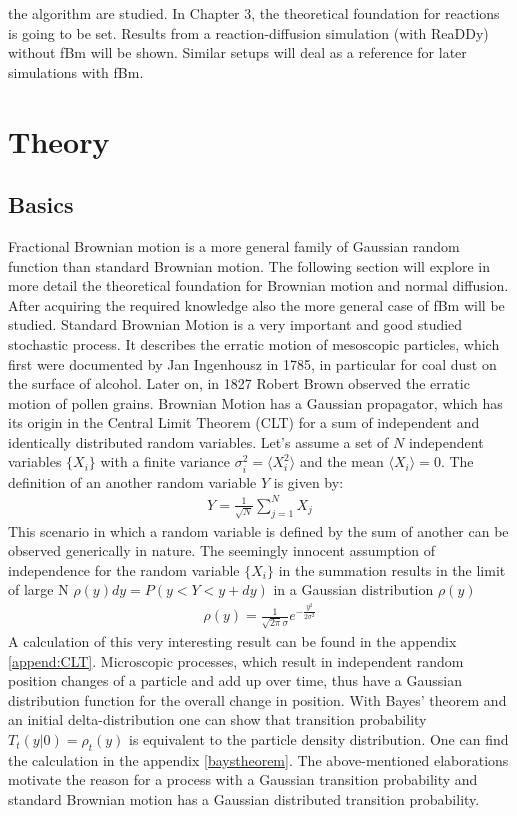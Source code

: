 \documentclass[
  a4paper,BCOR10mm,oneside,
  bibtotoc,idxtotoc,
  headsepline,footsepline,%
  fleqn,openbib
]{scrbook}
\begin{document}
the algorithm are studied. In Chapter 3, the theoretical foundation for reactions is going to be set. Results from a reaction-diffusion simulation (with ReaDDy) without fBm will be shown. Similar setups will deal as a reference for later simulations with fBm.

\chapter{Theory}
\section{Basics}
Fractional Brownian motion is a more general family of Gaussian random function than standard Brownian motion. The following section will explore in more detail the theoretical foundation for Brownian motion and normal diffusion. After acquiring the required knowledge also the more general case of fBm will be studied. \newline
Standard Brownian Motion is a very important and good studied stochastic process. It describes the erratic motion of mesoscopic particles, which first were documented by Jan Ingenhousz in 1785, in particular for coal dust on the surface of alcohol\cite{Hofling2013}. Later on, in 1827 Robert Brown observed the erratic motion of pollen grains. Brownian Motion has a Gaussian propagator, which has its origin in the Central Limit Theorem (CLT) for a sum of independent and identically distributed random variables. Let's assume a set of $N$ independent variables $\{X_i\}$ with a finite variance $ \sigma_i^2=\langle X_{i}^2\rangle $ and the mean $\langle X_{i}\rangle = 0$. The definition of an another random variable $Y$ is given by:
 \begin{align}
  Y = \frac{1}{\sqrt{N}} \sum_{j=1}^N X_j \label{eq:CLT}
 \end{align}
This scenario in which a random variable is defined by the sum of another can be observed generically in nature. The seemingly innocent assumption of independence for the random variable $\{X_i\}$ in the summation results in the limit of large N $\rho(y)dy=P(y<Y<y+dy)$ in a Gaussian distribution $\rho(y)$  
\begin{align}
 \rho(y) =\frac{1}{\sqrt{2 \pi} \sigma } e^{-\frac{y^2}{2 \sigma^2}}
\end{align}
A calculation of this very interesting result can be found in the appendix \ref{append:CLT}.    Microscopic processes, which result in independent random position changes of a particle and add up over time, thus have a Gaussian distribution function for the overall change in position. With  Bayes' theorem and an initial delta-distribution one can show that transition probability $T_{t}(y|0) = \rho_{t}(y)$ is equivalent to the particle density distribution. One can find the calculation in the appendix \ref{baystheorem}. The above-mentioned elaborations motivate the reason for a process with a Gaussian transition probability and standard Brownian motion has a Gaussian distributed transition probability. 
\end{document}

